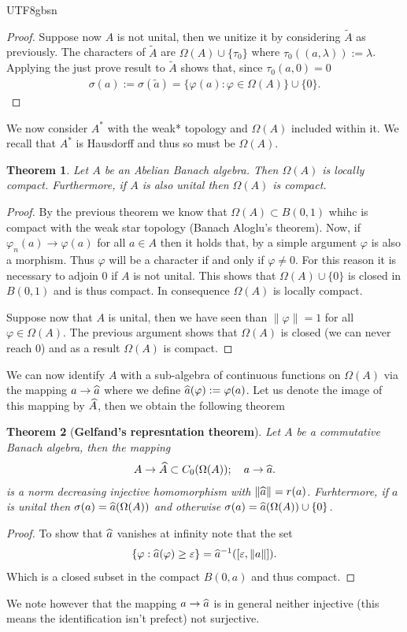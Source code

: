 \documentclass[12pt]{article}
\newtheorem{theorem}{Theorem}
\renewcommand{\norm}[1]{\lVert #1 \rVert}\renewcommand{\abs}[1]{\left| #1 \right|}
\begin{document}
\begin{CJK*}{UTF8}{gbsn}
\begin{proof}
		Suppose now $A$ is not unital, then we unitize it by considering  $\tilde{A}$ as previously. The characters of $\tilde{A}$ are $\Omega(A) \cup \{\tau_0\} $ where $\tau_0((a,\lambda )):= \lambda $. Applying the just prove result to $\tilde{A}$ shows that, since $\tau_0(a,0)=0$
		\begin{align*}
			\sigma (a):=\sigma (\tilde{a})=\{\varphi(a): \varphi \in \Omega(A)\} \cup \{0\}  .
		\end{align*}
	\end{proof}
	We now consider $A^*$ with the weak* topology and  $\Omega(A)$ included within it. We recall that $A^*$ is Hausdorff and thus so must be  $\Omega(A)$.
	\begin{theorem}Let $A$ be an Abelian Banach algebra. Then $\Omega(A)$ is locally compact. Furthermore, if $A$ is also unital then  $\Omega(A)$ is compact.
	\end{theorem}
	\begin{proof}
		By the previous theorem we know that $\Omega(A) \subset B(0,1)$ whihc is compact with the weak star topology (Banach Aloglu's theorem). Now, if $\varphi_n(a) \to \varphi(a)$ for all $a \in A$ then it holds that, by a simple argument $\varphi$ is also a morphism.  Thus $\varphi$ will be a character if and only if $\varphi \neq 0$. For this reason it is necessary to adjoin $0$ if $A$ is not unital. This shows that  $\Omega(A) \cup  \{0\} $ is closed in $B(0,1)$ and is thus compact. In consequence  $\Omega(A)$ is locally compact.

		Suppose now that $A$ is unital, then  we have seen than $\norm{\varphi}=1$ for all $\varphi \in  \Omega(A)$. The previous argument shows that $\Omega(A)$ is closed (we can never reach $0$) and as a result $\Omega(A)$ is compact.
	\end{proof}
	We can now identify $A$ with a sub-algebra of continuous functions on $\Omega(A)$ via the mapping $a \to \widehat{a}$ where we define $\widehat{a}(\varphi):= \varphi(a)$. Let us denote the image of this mapping by $\widehat{A}$, then we obtain the following theorem
	\begin{theorem}[\textbf{Gelfand's represntation theorem}]
		Let $A$ be a commutative Banach algebra, then the mapping
		\begin{align*}
			A \to\widehat{A} \subset C_0(\Omega(A)); \quad a\to \widehat{a}.
		\end{align*}
		is a norm decreasing  injective homomorphism with $\norm{\wh{a}}= r(a)$. Furhtermore, if $a$ is unital then  $\sigma (a)=\widehat{a}(\Omega(A))$ and otherwise $\sigma (a)=\widehat{a}(\Omega(A)) \cup  \{0\}$.
	\end{theorem}
	\begin{proof}
		To show that $\widehat{a}$ vanishes at infinity note that the set
		\begin{align*}
			\{\varphi : \wh{a}(\varphi) \geq \varepsilon \} =\wh{a}^{-1}([\varepsilon ,\norm{a}]).
		\end{align*}
		Which is a closed subset in the compact $B(0,a)$ and thus compact.
	\end{proof}
	We note however that the mapping $a \to \widehat{a}$ is in general neither injective (this means the identification isn't prefect) not surjective.


\end{CJK*}
\end{document}

